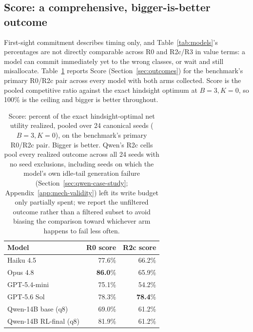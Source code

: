 \documentclass{article}
\begin{document}
\subsection{Score: a comprehensive, bigger-is-better outcome}
\label{sec:score}

First-sight commitment describes timing only, and Table~\ref{tab:models}'s
percentages are not directly comparable across R0 and R2c/R3 in value terms: a
model can commit immediately yet to the wrong classes, or wait and still
misallocate. Table~\ref{tab:score} reports Score (Section~\ref{sec:outcomes})
for the benchmark's primary R0/R2c pair across every model with both arms
collected. Score is the pooled competitive ratio against the exact hindsight
optimum at $B=3,K=0$, so 100\% is the ceiling and bigger is better throughout.

\begin{table}[h]
\centering
\caption{Score: percent of the exact hindsight-optimal net utility realized,
pooled over 24 canonical seeds ($B=3,K=0$), on the benchmark's primary R0/R2c
pair. Bigger is better. Qwen's R2c cells pool every realized outcome across
all 24 seeds with no seed exclusions, including seeds on which the model's
own idle-tail generation failure (Section~\ref{sec:qwen-case-study};
Appendix~\ref{app:mech-validity}) left its write budget only partially spent;
we report the unfiltered outcome rather than a filtered subset to avoid
biasing the comparison toward whichever arm happens to fail less often.}
\label{tab:score}
\begin{tabular}{lrr}
\hline
Model & R0 score & R2c score \\
\hline
Haiku 4.5 & 77.6\% & 66.2\% \\
Opus 4.8 & \textbf{86.0}\% & 65.9\% \\
GPT-5.4-mini & 75.1\% & 54.2\% \\
GPT-5.6 Sol & 78.3\% & \textbf{78.4}\% \\
Qwen-14B base (q8) & 69.0\% & 61.2\% \\
Qwen-14B RL-final (q8) & 81.9\% & 61.2\% \\
\hline
\end{tabular}
\end{table}
\end{document}

